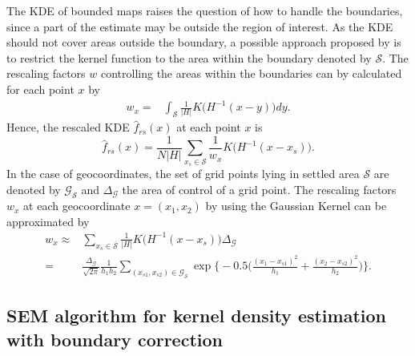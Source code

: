The KDE of bounded maps raises the question of how to handle the boundaries, since a part of the estimate may be outside the region of interest. As the KDE should not cover areas outside the boundary, a possible approach proposed by \cite{Jones1993} is to restrict the kernel function to the area within the boundary denoted by $\mathcal{S}$. The rescaling factors $w$ controlling the areas within the boundaries can by calculated for each point $x$ by 
\begin{align*}
    w_x = & \int_{\mathcal{S}} \frac{1}{|H|} K \Big(H^{-1}(x-y) \Big) dy.
\end{align*}
Hence, the rescaled KDE $\hat{f}_{rs}(x)$ at each point $x$ is 
\begin{equation}\label{eq:f_rs}
    \hat{f}_{rs}(x) = \frac{1}{N|H|} \sum_{x_s \in \mathcal{S}} \frac{1}{w_x} K \Big(H^{-1}(x-x_s) \Big).
\end{equation}
In the case of geocoordinates, the set of grid points lying in settled area $\mathcal{S}$ are denoted by $\mathcal{G}_{\mathcal{S}}$ and $\Delta_{\mathcal{G}}$ the area of control of a grid point. The rescaling factors $w_x$ at each geocoordinate $x = (x_1, x_2) $ by using the Gaussian Kernel can be approximated by 
\begin{align}\label{eq:w_x}
    w_x \approx & \sum_{x_s \in \mathcal{S}} \frac{1}{|H|} K \Big(H^{-1}(x-x_s) \Big) \Delta_{\mathcal{G}} \nonumber \\ 
    = & \frac{\Delta_{\mathcal{G}}}{\sqrt{2\pi}} \frac{1}{h_1 h_2} \sum_{(x_{s1}, x_{s2}) \in \mathcal{G}_\mathcal{S}} \exp{\Bigg\{-0.5 \Bigg(\frac{(x_1 - x_{s1})^2}{h_1}  + \frac{(x_2 - x_{s2})^2}{h_2}\Bigg) \Bigg\}}.
\end{align}

\hypertarget{SEM-algorithm-for-kernel-density-estimation-with-boundary-correction}{%
\subsection{SEM algorithm for kernel density estimation with boundary correction}\label{SEM-algorithm-for-kernel-density-estimation-with-boundary-correction}}


